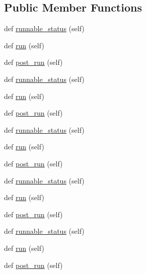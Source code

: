\subsection*{Public Member Functions}
\begin{DoxyCompactItemize}
\item 
def \hyperlink{classwaflib_1_1_tools_1_1javaw_1_1javac_ad4b104e6cab732d1c359b0f7b80e2401}{runnable\+\_\+status} (self)
\item 
def \hyperlink{classwaflib_1_1_tools_1_1javaw_1_1javac_a3b874d7ac9845d4a49a194f0588c7495}{run} (self)
\item 
def \hyperlink{classwaflib_1_1_tools_1_1javaw_1_1javac_ad1cd4d9b4daefc8ea4243fd97a898256}{post\+\_\+run} (self)
\item 
def \hyperlink{classwaflib_1_1_tools_1_1javaw_1_1javac_ad4b104e6cab732d1c359b0f7b80e2401}{runnable\+\_\+status} (self)
\item 
def \hyperlink{classwaflib_1_1_tools_1_1javaw_1_1javac_a3b874d7ac9845d4a49a194f0588c7495}{run} (self)
\item 
def \hyperlink{classwaflib_1_1_tools_1_1javaw_1_1javac_ad1cd4d9b4daefc8ea4243fd97a898256}{post\+\_\+run} (self)
\item 
def \hyperlink{classwaflib_1_1_tools_1_1javaw_1_1javac_ad4b104e6cab732d1c359b0f7b80e2401}{runnable\+\_\+status} (self)
\item 
def \hyperlink{classwaflib_1_1_tools_1_1javaw_1_1javac_a3b874d7ac9845d4a49a194f0588c7495}{run} (self)
\item 
def \hyperlink{classwaflib_1_1_tools_1_1javaw_1_1javac_ad1cd4d9b4daefc8ea4243fd97a898256}{post\+\_\+run} (self)
\item 
def \hyperlink{classwaflib_1_1_tools_1_1javaw_1_1javac_ad4b104e6cab732d1c359b0f7b80e2401}{runnable\+\_\+status} (self)
\item 
def \hyperlink{classwaflib_1_1_tools_1_1javaw_1_1javac_a3b874d7ac9845d4a49a194f0588c7495}{run} (self)
\item 
def \hyperlink{classwaflib_1_1_tools_1_1javaw_1_1javac_ad1cd4d9b4daefc8ea4243fd97a898256}{post\+\_\+run} (self)
\item 
def \hyperlink{classwaflib_1_1_tools_1_1javaw_1_1javac_ad4b104e6cab732d1c359b0f7b80e2401}{runnable\+\_\+status} (self)
\item 
def \hyperlink{classwaflib_1_1_tools_1_1javaw_1_1javac_a3b874d7ac9845d4a49a194f0588c7495}{run} (self)
\item 
def \hyperlink{classwaflib_1_1_tools_1_1javaw_1_1javac_ad1cd4d9b4daefc8ea4243fd97a898256}{post\+\_\+run} (self)

\end{DoxyCompactItemize}
